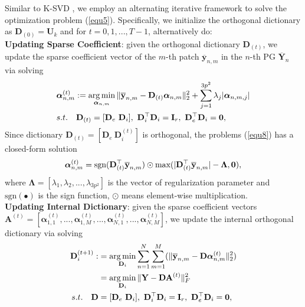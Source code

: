 \documentclass[10pt,twocolumn,letterpaper]{article}
\DeclareMathOperator*{\argmin}{arg\,min}
\begin{document}
Similar to K-SVD \cite{ksvd}, we employ an alternating iterative framework to solve the optimization problem (\ref{equ5}). Specifically, we initialize the orthogonal dictionary as $\mathbf{D}_{(0)}=\mathbf{U}_{k}$ and for $t=0, 1, ..., T-1$, alternatively do:
\\
\textbf{Updating Sparse Coefficient}: given the orthogonal dictionary $\textbf{D}_{(t)}$, we update the sparse coefficient vector of the $m$-th patch $\mathbf{\overline{y}}_{n,m}$ in the $n$-th PG $\mathbf{\overline{Y}}_{n}$ via solving
\vspace{-3mm}
\begin{equation}\label{equ8}\vspace{-3mm}
\begin{split}
&\bm{\alpha}_{n,m}^{(t)}:=\argmin_{\bm{\alpha}_{n,m}}
\|\mathbf{\overline{y}}_{n,m}-\mathbf{D}_{(t)}\bm{\alpha}_{n,m}\|_{2}^{2}+\sum_{j=1}^{3p^{2}}\lambda_{j}|\bm{\alpha}_{n,m,j}|
\\
&
s.t.
\quad
\mathbf{D}_{(t)}=[\mathbf{D}_{e}\ \mathbf{D}_{i}],\ \mathbf{D}_{i}^{\top}\mathbf{D}_{i} = \mathbf{I}_{r},\ \mathbf{D}_{e}^{\top}\mathbf{D}_{i} = \mathbf{0},
\end{split}
\end{equation}
Since dictionary $\mathbf{D}_{(t)}=[\mathbf{D}_{e}\ \mathbf{D}_{i}^{(t)}]$ is orthogonal, the problems (\ref{equ8}) has a closed-form solution \cite{pgpd} 
\vspace{-1mm}
\begin{equation}\label{equ9}\vspace{-1mm}
\bm{\alpha}_{n,m}^{(t)}= \text{sgn}(\mathbf{D}_{(t)}^{\top}\mathbf{\overline{y}}_{n,m})\odot \text{max}(|\mathbf{D}_{(t)}^{\top}\mathbf{\overline{y}}_{n,m}|-\mathbf{\Lambda},\mathbf{0}),
\end{equation}
where $\mathbf{\Lambda} = [\lambda_{1},\lambda_{2},...,\lambda_{3p^2}]$ is the vector of regularization parameter and $\text{sgn}(\bullet)$ is the sign function, $\odot$ means element-wise multiplication.
\\
\textbf{Updating Internal Dictionary}: given the sparse coefficient vectors $\textbf{A}^{(t)}=[\bm{\alpha}_{1,1}^{(t)},...,\bm{\alpha}_{1,M}^{(t)},...,\bm{\alpha}_{N,1}^{(t)},...,\bm{\alpha}_{N,M}^{(t)}]$, we update the internal orthogonal dictionary via solving
\vspace{-2mm}
\begin{equation}\label{equ10} \vspace{-2mm}
\begin{split}
\textbf{D}_{i}^{(t+1)}
:
&
=
\argmin_{\textbf{D}_{i}}
\sum_{n=1}^{N}\sum_{m=1}^{M}(\|\mathbf{\overline{y}}_{n,m}-\mathbf{D}\bm{\alpha}_{n,m}^{(t)}\|_{2}^{2})
\\
&
=
\argmin_{\textbf{D}_{i}}
\|\mathbf{Y}-\mathbf{D}\mathbf{A}^{(t)}\|_{F}^{2}
\\
s.t.
\quad
\mathbf{D}
&
=
[\mathbf{D}_{e}\ \mathbf{D}_{i}],\ \mathbf{D}_{i}^{\top}\mathbf{D}_{i} = \mathbf{I}_{r},\ \mathbf{D}_{e}^{\top}\mathbf{D}_{i} = \mathbf{0},
\end{split}
\end{equation}
\end{document}
